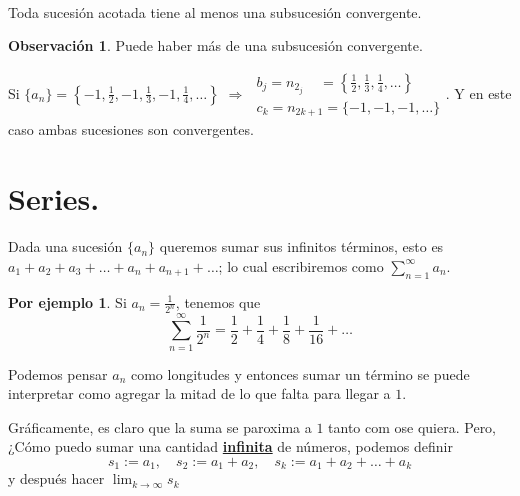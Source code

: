 \documentclass{article}
\theoremstyle{definition}
\newtheorem*{obs}{Observación}
\newtheorem*{ej}{Por ejemplo}
\theoremstyle{remark}
\begin{document}
\begin{teo} \; \\
  Toda sucesión acotada tiene al menos una subsucesión convergente.
\end{teo}
\begin{obs}
  Puede haber más de una subsucesión convergente. 
\end{obs}

Si $\{a_n\} = \left\{ -1,\frac{1}{2},-1,\frac{1}{3},-1,\frac{1}{4},\dots \right\}$
$\Rightarrow$ 
$\begin{array}{l}
  b_j = n_{2_j} \; \; \; \; = \left\{ \frac{1}{2}, \frac{1}{3}, \frac{1}{4}, \dots \right\}\\
  c_k = n_{2k+1} = \{ -1,-1,-1,\dots \}
\end{array}.$
Y en este caso ambas sucesiones son convergentes.

\section{Series.}

Dada una sucesión $\{ a_n \}$ queremos sumar sus infinitos términos, esto es $a_1+a_2+a_3+ \dots + a_n + a_{n+1} + \dots $; lo cual escribiremos como $\sum_{n=1}^{\infty}{a_n} $. \\

\begin{ej}  Si $a_n=\frac{1}{2^n}$, tenemos que  $$\sum_{n=1}^{\infty}{\frac{1}{2^n}}=\frac{1}{2}+\frac{1}{4}+\frac{1}{8}+\frac{1}{16}+\dots$$

\end{ej}

Podemos pensar $a_n$ como longitudes y entonces sumar un término se puede interpretar como agregar la mitad de lo que falta para llegar a $1$.\begin{figure}[h]
\centering
\def\svgwidth{0.75\textwidth}

\end{figure}

Gráficamente, es claro que la suma se paroxima a $1$ tanto com ose quiera. Pero, ¿Cómo puedo sumar una cantidad \textbf{\underline{infinita}} de números, podemos definir \[
  s_1:=a_1, \quad s_2:=a_1+a_2,\quad s_k:= a_1+a_2+\dots + a_k
\]
y después hacer $ \lim_{k \to \infty}{s_k} $
\end{document}
